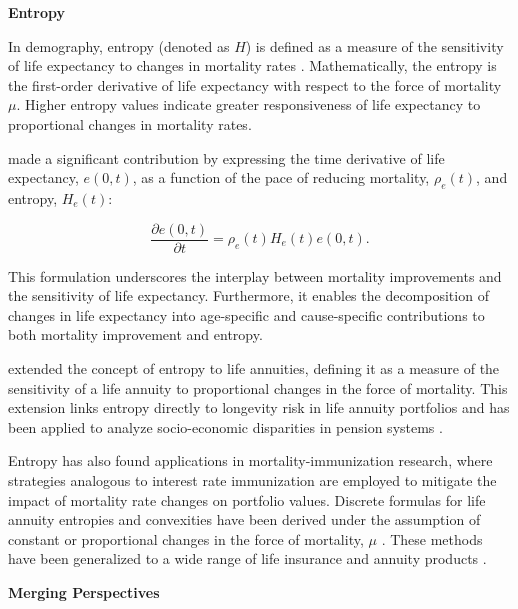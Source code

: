 \documentclass[12pt]{article}
\begin{document}
\textbf{Entropy}

In demography, entropy (denoted as $H$) is defined as a measure of the sensitivity of life expectancy to changes in mortality rates \citep{leser1955variations,keyfitz1977difference,demetrius1974demographic,goldman1986new, aburto2019threshold}. Mathematically, the entropy is the first-order derivative of life expectancy with respect to the force of mortality $\mu$. Higher entropy values indicate greater responsiveness of life expectancy to proportional changes in mortality rates.

\citet{Vaupel2003} made a significant contribution by expressing the time derivative of life expectancy, $e(0, t)$, as a function of the pace of reducing mortality, $\rho_e(t)$, and entropy, $H_e(t)$:

\begin{equation}\label{eq:lifeexpdecomp}
	\dfrac{\partial e(0,t)}{\partial t} = \rho_e(t) H_e(t) e(0,t).
\end{equation}

This formulation underscores the interplay between mortality improvements and the sensitivity of life expectancy. Furthermore, it enables the decomposition of changes in life expectancy into age-specific and cause-specific contributions to both mortality improvement and entropy.

\citet{Haberman2011} extended the concept of entropy to life annuities, defining it as a measure of the sensitivity of a life annuity to proportional changes in the force of mortality. This extension links entropy directly to longevity risk in life annuity portfolios \citep{rabitti2020mortality} and has been applied to analyze socio-economic disparities in pension systems \citep{alvarez2021linking}.

Entropy has also found applications in mortality-immunization research, where strategies analogous to interest rate immunization are employed to mitigate the impact of mortality rate changes on portfolio values. Discrete formulas for life annuity entropies and convexities have been derived under the assumption of constant or proportional changes in the force of mortality, $\mu$ \citep{wang2010optimal,tsai2011actuarial,Tsai2013a,Li2011}. These methods have been generalized to a wide range of life insurance and annuity products \citep{li2012key,Li2012,Wong2015,Luciano2015,levantesi2018natural}.

\textbf{Merging Perspectives}
\end{document}
